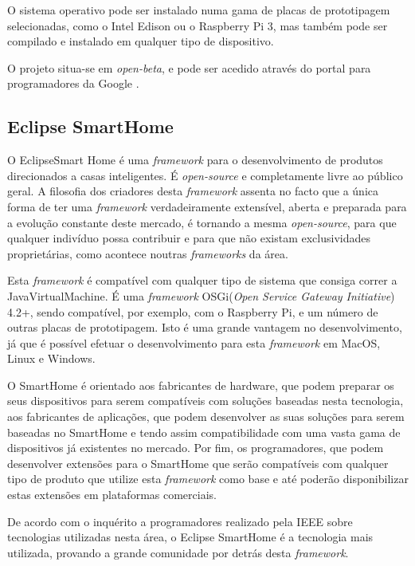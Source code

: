 O sistema operativo pode ser instalado numa gama de placas de prototipagem selecionadas, como o Intel Edison ou o Raspberry Pi 3, mas também pode ser compilado e instalado em qualquer tipo de dispositivo.

O projeto situa-se em \textit{open-beta}, e pode ser acedido através do portal para programadores da Google \cite{android-things}.

\subsection{Eclipse SmartHome}

O EclipseSmart Home é uma \textit{framework} para o desenvolvimento de produtos direcionados a casas inteligentes. É \textit{open-source} e completamente livre ao público geral. A filosofia dos criadores desta \textit{framework} assenta no facto que a única forma de ter uma \textit{framework} verdadeiramente extensível, aberta e preparada para a evolução constante deste mercado, é tornando a mesma \textit{open-source}, para que qualquer indivíduo possa contribuir e para que não existam exclusividades proprietárias, como acontece noutras \textit{frameworks} da área.

Esta \textit{
framework} é compatível com qualquer tipo de sistema que consiga correr a JavaVirtualMachine. É uma \textit{framework} OSGi(\textit{Open Service Gateway Initiative}) 4.2+, sendo compatível, por exemplo, com o Raspberry Pi, e um número de outras placas de prototipagem. Isto é uma grande vantagem no desenvolvimento, já que é possível efetuar o desenvolvimento para esta \textit{framework} em MacOS, Linux e Windows.


O SmartHome é orientado aos fabricantes de hardware, que podem preparar os seus dispositivos para serem compatíveis com soluções baseadas nesta tecnologia, aos fabricantes de aplicações, que podem desenvolver as suas soluções para serem baseadas no SmartHome e tendo assim compatibilidade com uma vasta gama de dispositivos já existentes no mercado. Por fim, os programadores, que podem desenvolver extensões para o SmartHome que serão compatíveis com qualquer tipo de produto que utilize esta \textit{framework} como base e até poderão disponibilizar estas extensões em plataformas comerciais.

De acordo com o inquérito \cite{ieeesurvey} a programadores realizado pela IEEE sobre tecnologias utilizadas nesta área, o Eclipse SmartHome é a tecnologia mais utilizada, provando a grande comunidade por detrás desta \textit{framework}.

